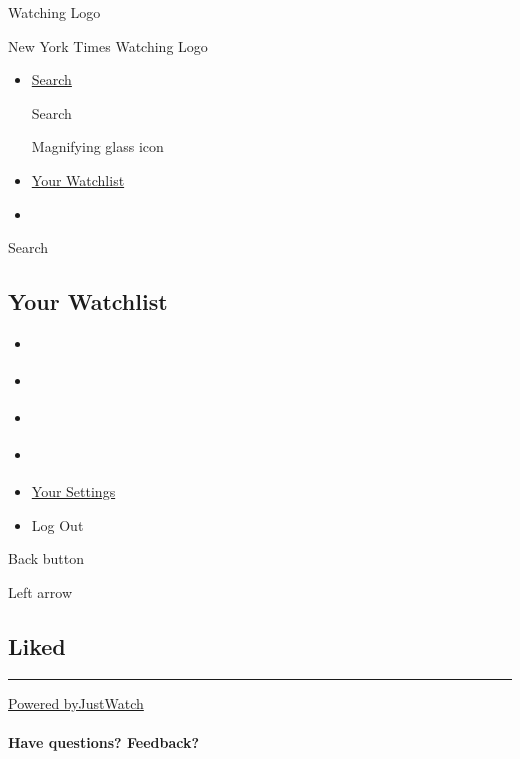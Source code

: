 \href{/watching}{}

Watching Logo

New York Times Watching Logo

\begin{itemize}
\item
  \href{/watching/search}{Search}

  Search

  Magnifying glass icon
\item
  \href{/watching/watchlist}{Your Watchlist}
\item
\end{itemize}

Search

\hypertarget{your-watchlist}{%
\subsection{Your Watchlist}\label{your-watchlist}}

\begin{itemize}
\tightlist
\item
  \href{/watching/watchlist/foryou}{}
\end{itemize}

\begin{itemize}
\tightlist
\item
  \href{/watching/watchlist}{}
\item
  \href{/watching/watchlist/liked}{}
\item
  \href{/watching/watchlist/watched}{}
\end{itemize}

\begin{itemize}
\tightlist
\item
  \href{/watching/settings}{Your Settings}
\item
  Log Out
\end{itemize}

Back button

Left arrow

\hypertarget{liked}{%
\subsection{Liked}\label{liked}}

\begin{center}\rule{0.5\linewidth}{\linethickness}\end{center}

\href{https://www.gowatchit.com}{Powered byJustWatch}

\hypertarget{have-questions-feedback}{%
\paragraph{Have questions? Feedback?}\label{have-questions-feedback}}

